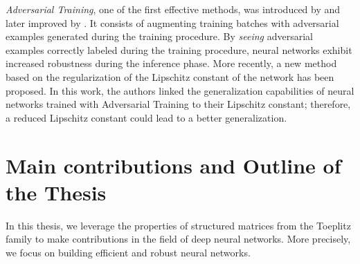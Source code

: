 \emph{Adversarial Training}, one of the first effective methods, was introduced by \citet{goodfellow2014explaining} and later improved by \citet{madry2018towards}.
It consists of augmenting training batches with adversarial examples generated during the training procedure.
By \emph{seeing} adversarial examples correctly labeled during the training procedure, neural networks exhibit increased robustness during the inference phase.
More recently, a new method \cite{farnia2018generalizable} based on the regularization of the Lipschitz constant of the network has been proposed.
In this work, the authors linked the generalization capabilities of neural networks trained with Adversarial Training to their Lipschitz constant; therefore, a reduced Lipschitz constant could lead to a better generalization.



\section{Main contributions and Outline of the Thesis}
\label{section:ch1-main_contributions_and_outline_of_the_thesis}


%

In this thesis, we leverage the properties of structured matrices from the Toeplitz family to make contributions in the field of deep neural networks.
More precisely, we focus on building efficient and robust neural networks. 

